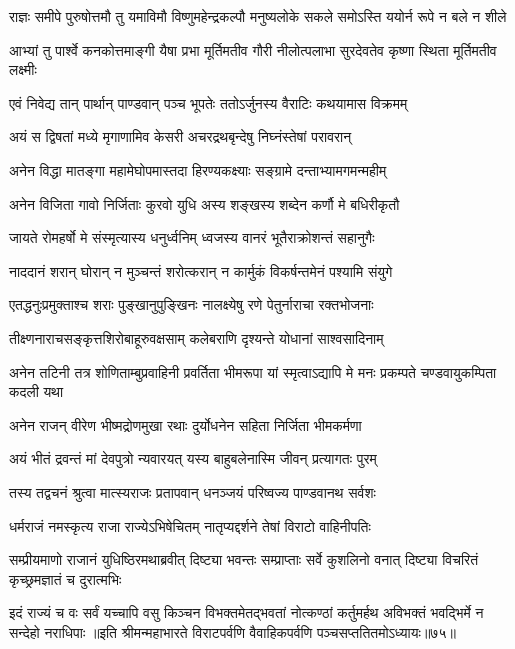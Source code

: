 \fourlineindentedshloka
{राज्ञः समीपे पुरुषोत्तमौ तु}
{यमाविमौ विष्णुमहेन्द्रकल्पौ}
{मनुष्यलोके सकले समोऽस्ति}
{ययोर्न रूपे न बले न शीले}


\fourlineindentedshloka
{आभ्यां तु पार्श्वे कनकोत्तमाङ्गी}
{यैषा प्रभा मूर्तिमतीव गौरी}
{नीलोत्पलाभा सुरदेवतेव}
{कृष्णा स्थिता मूर्तिमतीव लक्ष्मीः}



\twolineshloka
{एवं निवेद्य तान् पार्थान् पाण्डवान् पञ्च भूपतेः}
{ततोऽर्जुनस्य वैराटिः कथयामास विक्रमम्}


\twolineshloka
{अयं स द्विषतां मध्ये मृगाणामिव केसरी}
{अचरद्रथबृन्देषु निघ्नंस्तेषां परावरान्}


\twolineshloka
{अनेन विद्धा मातङ्गा महामेघोपमास्तदा}
{हिरण्यकक्ष्याः सङ्ग्रामे दन्ताभ्यामगमन्महीम्}


\twolineshloka
{अनेन विजिता गावो निर्जिताः कुरवो युधि}
{अस्य शङ्खस्य शब्देन कर्णौ मे बधिरीकृतौ}


\twolineshloka
{जायते रोमहर्षो मे संस्मृत्यास्य धनुर्ध्वनिम्}
{ध्वजस्य वानरं भूतैराक्रोशन्तं सहानुगैः}


\twolineshloka
{नाददानं शरान् घोरान् न मुञ्चन्तं शरोत्करान्}
{न कार्मुकं विकर्षन्तमेनं पश्यामि संयुगे}


\twolineshloka
{एतद्धनुःप्रमुक्ताश्च शराः पुङ्खानुपुङ्खिनः}
{नालक्ष्येषु रणे पेतुर्नाराचा रक्तभोजनाः}


\twolineshloka
{तीक्ष्णनाराचसङ्कृत्तशिरोबाहूरुवक्षसाम्}
{कलेबराणि दृश्यन्ते योधानां साश्वसादिनाम्}


\threelineshloka
{अनेन तटिनी तत्र शोणिताम्बुप्रवाहिनी}
{प्रवर्तिता भीमरूपा यां स्मृत्वाऽद्यापि मे मनः}
{प्रकम्पते चण्डवायुकम्पिता कदली यथा}


\twolineshloka
{अनेन राजन् वीरेण भीष्मद्रोणमुखा रथाः}
{दुर्योधनेन सहिता निर्जिता भीमकर्मणा}


\twolineshloka
{अयं भीतं द्रवन्तं मां देवपुत्रो न्यवारयत्}
{यस्य बाहुबलेनास्मि जीवन् प्रत्यागतः पुरम्}



\twolineshloka
{तस्य तद्वचनं श्रुत्वा मात्स्यराजः प्रतापवान्}
{धनञ्जयं परिष्वज्य पाण्डवानथ सर्वशः}


\twolineshloka
{धर्मराजं नमस्कृत्य राजा राज्येऽभिषेचितम्}
{नातृप्यद्दर्शने तेषां विराटो वाहिनीपतिः}


\threelineshloka
{सम्प्रीयमाणो राजानं युधिष्ठिरमथाब्रवीत्}
{दिष्ट्या भवन्तः सम्प्राप्ताः सर्वे कुशलिनो वनात्}
{दिष्ट्या विचरितं कृच्छ्रमज्ञातं च दुरात्मभिः}


\threelineshloka
{इदं राज्यं च वः सर्वं यच्चापि वसु किञ्चन}
{विभक्तमेतद्भवतां नोत्कण्ठां कर्तुमर्हथ}
{अविभक्तं भवद्भिर्मे न सन्देहो नराधिपाः}
॥इति श्रीमन्महाभारते विराटपर्वणि वैवाहिकपर्वणि पञ्चसप्ततितमोऽध्यायः॥७५॥

